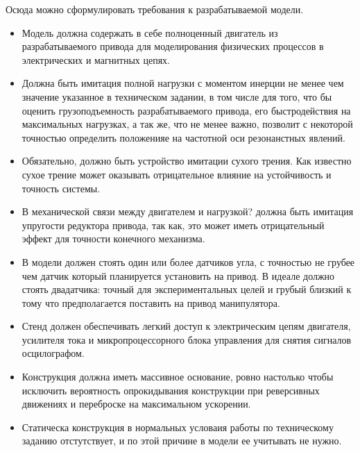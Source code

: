 Осюда можно сформулировать требования к разрабатываемой модели.
\begin{itemize}
    \item Модель должна содержать в себе полноценный двигатель из разрабатываемого
    привода для моделирования физических процессов в электрических и магнитных цепях.

    \item Должна быть имитация полной нагрузки с моментом инерции не менее чем
    значение указанное в техническом задании, в том числе для того, что бы оценить
    грузоподъемность разрабатываемого привода, его быстродействия на максимальных
    нагрузках, а так же, что не менее важно, позволит с некоторой точностью
    определить положенияе на частотной оси резонанстных явлений.

    \item Обязательно, должно быть устройство имитации сухого трения. Как
    известно сухое трение может оказывать отрицательное влияние на устойчивость
    и точность системы.

    \item В механической связи между двигателем и нагрузкой? должна быть имитация
    упругости редуктора привода, так как, это может иметь отрицательный эффект
    для точности конечного механизма.

    \item В модели должен стоять один или более датчиков угла, с точностью не
    грубее чем датчик который планируется установить на привод. В идеале должно
    стоять двадатчика: точный для экспериментальных целей и грубый близкий
    к тому что предполагается поставить на привод манипулятора.

    \item Стенд должен обеспечивать легкий доступ к электрическим цепям двигателя,
    усилителя тока и микропроцессорного блока управления для снятия сигналов
    осцилографом.

    \item Конструкция должна иметь массивное основание, ровно настолько чтобы
    исключить вероятность опрокидывания конструкции при реверсивных движениях
    и переброске на максимальном ускорении.

    \item Статическа конструкция в нормальных условаия работы по техническому
    заданию отстутствует, и по этой причине в модели ее учитывать не нужно.
\end{itemize}

\endinput

